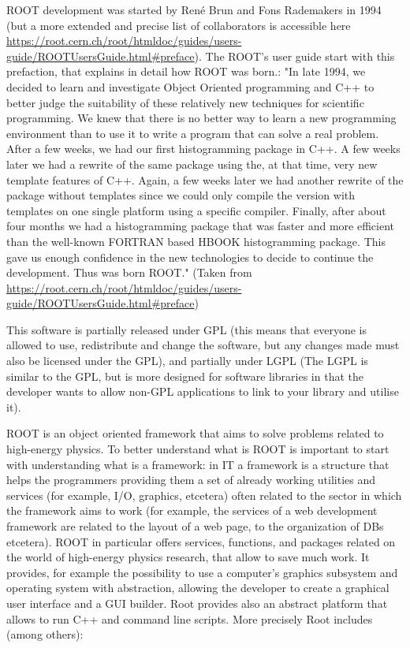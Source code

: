 ROOT development was started by René Brun and Fons Rademakers in 1994 (but a more extended and precise list of collaborators is accessible here \url{https://root.cern.ch/root/htmldoc/guides/users-guide/ROOTUsersGuide.html#preface}). 
The ROOT's user guide start with this prefaction, that explains in detail how ROOT was born.:
"In late 1994, we decided to learn and investigate Object Oriented programming and C++ to better judge the suitability of these relatively new techniques for scientific programming. We knew that there is no better way to learn a new programming environment than to use it to write a program that can solve a real problem. After a few weeks, we had our first histogramming package in C++. A few weeks later we had a rewrite of the same package using the, at that time, very new template features of C++. Again, a few weeks later we had another rewrite of the package without templates since we could only compile the version with templates on one single platform using a specific compiler. Finally, after about four months we had a histogramming package that was faster and more efficient than the well-known FORTRAN based HBOOK histogramming package. This gave us enough confidence in the new technologies to decide to continue the development. Thus was born ROOT."
(Taken from \url{https://root.cern.ch/root/htmldoc/guides/users-guide/ROOTUsersGuide.html#preface})


This software is partially released under GPL (this means that everyone is allowed to use, redistribute and change the software, but any changes made must also be licensed under the GPL), and partially under LGPL (The LGPL is similar to the GPL, but is more designed for software libraries in that the developer wants to allow non-GPL applications to link to your library and utilise it).

ROOT is an object oriented framework that aims to solve problems related to high-energy physics. To better understand what is ROOT is important to start with understanding what is a framework: in IT a framework is a structure that helps the programmers providing them a set of already working utilities and services (for example, I/O, graphics, etcetera) often related to the sector in which the framework aims to work (for example, the services of a web development framework are related to the layout of a web page, to the organization of DBs etcetera). ROOT in particular offers services, functions, and packages related on the world of high-energy physics research, that allow to save much work.
It provides, for example the possibility to use a computer's graphics subsystem and operating system with abstraction, allowing the developer to create a graphical user interface and a GUI builder. Root provides also an abstract platform that allows to run C++ and command line scripts. More precisely Root includes (among others):

